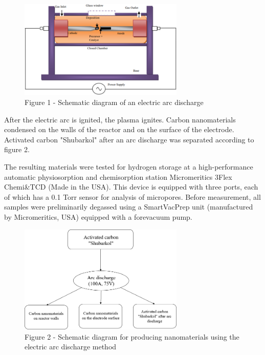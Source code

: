 \begin{figure}[H]
	\centering
	\includegraphics[width=0.7\textwidth]{assets/53}
	\caption*{Figure 1 - Schematic diagram of an electric arc discharge}
\end{figure}

\begin{multicols}{2}
After the electric arc is ignited, the plasma ignites. Carbon
nanomaterials condensed on the walls of the reactor and on the surface
of the electrode. Activated carbon "Shubarkol" after an arc discharge
was separated according to figure 2.

The resulting materials were tested for hydrogen storage at a
high-performance automatic physiosorption and chemisorption station
Micromeritics 3Flex Chemi\&TCD (Made in the USA). This device is
equipped with three ports, each of which has a 0.1 Torr sensor for
analysis of micropores. Before measurement, all samples were
preliminarily degassed using a SmartVacPrep unit (manufactured by
Micromeritics, USA) equipped with a forevacuum pump.
\end{multicols}

\begin{figure}[H]
	\centering
	\includegraphics[width=0.7\textwidth]{assets/54}
	\caption*{Figure 2 - Schematic diagram for producing nanomaterials using the electric arc discharge method}
\end{figure}

